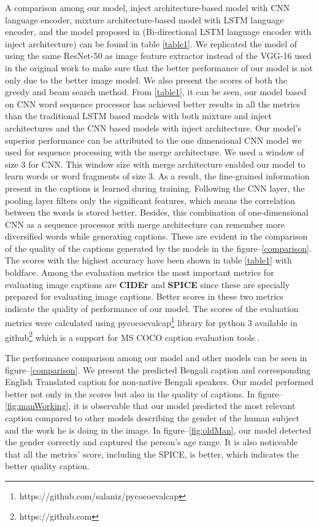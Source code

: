 \documentclass[runningheads]{llncs}
\begin{document}
A comparison among our model, inject architecture-based model with CNN language encoder, mixture architecture-based model with LSTM language encoder, and the model proposed in \cite{chittron} (Bi-directional LSTM language encoder with inject architecture) can be found in table \ref{table1}. We replicated the model of \cite{chittron} using the same ResNet-50 as image feature extractor instead of the VGG-16 \cite{vgg16} used in the original work to make sure that the better performance of our model is not only due to the better image model. We also present the scores of both the greedy and beam search method. From \ref{table1}, it can be seen, our model based on CNN word sequence processor has achieved better results in all the metrics than the traditional LSTM based models with both mixture and inject architectures and the CNN based models with inject architecture.  Our model's superior performance can be attributed to the one dimensional CNN model we used for sequence processing with the merge architecture. We used a window of size 3 for CNN. This window size with merge architecture enabled our model to learn words or word fragments of size 3. As a result, the fine-grained information present in the captions is learned during training. Following the CNN layer, the pooling layer filters only the significant features, which means the correlation between the words is stored better. Besides, this combination of one-dimensional CNN as a sequence processor with merge architecture can remember more diversified words while generating captions. These are evident in the comparison of the quality of the captions generated by the models in the figure--\ref{comparison}. The scores with the highest accuracy have been shown in table \ref{table1} with boldface. Among the evaluation metrics the most important metrics for evaluating image captions are \textbf{CIDEr} \cite{cider} and \textbf{SPICE} \cite{spice} since these are specially prepared for evaluating image captions. Better scores in these two metrics indicate the quality of performance of our model. The scores of the evaluation metrics were calculated using pycocoevalcap\footnote{https://github.com/salaniz/pycocoevalcap} library for python 3 available in github\footnote{https://github.com} which is a support for MS COCO caption evaluation tools \cite{mscoco_eval_tool}.

The performance comparison among our model and other models can be seen in figure--\ref{comparison}. We present the predicted Bengali caption and corresponding English Translated caption for non-native Bengali speakers. Our model performed better not only in the scores but also in the quality of captions. In figure--\ref{fig:manWorking}, it is observable that our model predicted the most relevant caption compared to other models describing the gender of the human subject and the work he is doing in the image.  In figure--\ref{fig:oldMan}, our model detected the gender correctly and captured the person's age range. It is also noticeable that all the metrics' score, including the SPICE, is better, which indicates the better quality caption.
\end{document}
